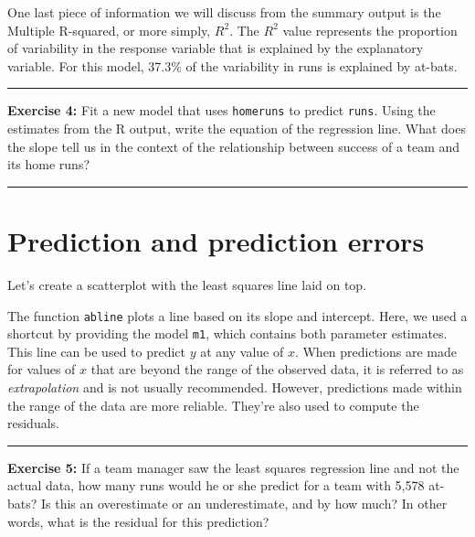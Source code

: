 \documentclass[]{book}
\newenvironment{Shaded}{\begin{snugshade}}{\end{snugshade}}
\newcommand{\KeywordTok}[1]{\textcolor[rgb]{0.13,0.29,0.53}{\textbf{{#1}}}}
\newcommand{\StringTok}[1]{\textcolor[rgb]{0.31,0.60,0.02}{{#1}}}
\newcommand{\NormalTok}[1]{{#1}}
\theoremstyle{definition}
\theoremstyle{definition}
\theoremstyle{definition}
\theoremstyle{remark}
\begin{document}
One last piece of information we will discuss from the summary output is
the Multiple R-squared, or more simply, \(R^2\). The \(R^2\) value
represents the proportion of variability in the response variable that
is explained by the explanatory variable. For this model, 37.3\% of the
variability in runs is explained by at-bats.

\begin{center}\rule{0.5\linewidth}{\linethickness}\end{center}

\textbf{Exercise 4:} Fit a new model that uses \texttt{homeruns} to
predict \texttt{runs}. Using the estimates from the R output, write the
equation of the regression line. What does the slope tell us in the
context of the relationship between success of a team and its home runs?

\begin{center}\rule{0.5\linewidth}{\linethickness}\end{center}

\section{Prediction and prediction
errors}\label{prediction-and-prediction-errors}

Let's create a scatterplot with the least squares line laid on top.

\begin{Shaded}
\end{Shaded}

The function \texttt{abline} plots a line based on its slope and
intercept. Here, we used a shortcut by providing the model \texttt{m1},
which contains both parameter estimates. This line can be used to
predict \(y\) at any value of \(x\). When predictions are made for
values of \(x\) that are beyond the range of the observed data, it is
referred to as \emph{extrapolation} and is not usually recommended.
However, predictions made within the range of the data are more
reliable. They're also used to compute the residuals.

\begin{center}\rule{0.5\linewidth}{\linethickness}\end{center}

\textbf{Exercise 5:} If a team manager saw the least squares regression
line and not the actual data, how many runs would he or she predict for
a team with 5,578 at-bats? Is this an overestimate or an underestimate,
and by how much? In other words, what is the residual for this
prediction?
\end{document}
